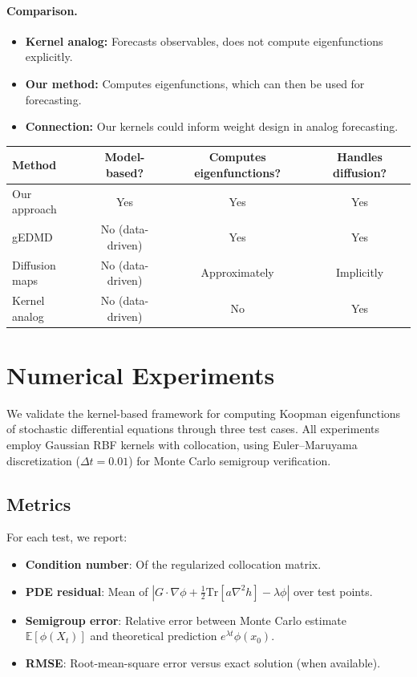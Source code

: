 \documentclass[11pt,a4paper]{article}
\newcommand{\E}{\mathbb{E}}
\newcommand{\Tr}{\mathrm{Tr}}
\begin{document}
\paragraph{Comparison.}
\begin{itemize}
\item \textbf{Kernel analog:} Forecasts observables, does not compute eigenfunctions explicitly.
\item \textbf{Our method:} Computes eigenfunctions, which can then be used for forecasting.
\item \textbf{Connection:} Our kernels could inform weight design in analog forecasting.
\end{itemize}

\begin{center}
\begin{tabular}{lccc}
\toprule
Method & Model-based? & Computes eigenfunctions? & Handles diffusion? \\
\midrule
Our approach & Yes & Yes & Yes \\
gEDMD & No (data-driven) & Yes & Yes \\
Diffusion maps & No (data-driven) & Approximately & Implicitly \\
Kernel analog & No (data-driven) & No & Yes \\
\bottomrule
\end{tabular}
\end{center}

\section{Numerical Experiments}\label{sec:numerical}

We validate the kernel-based framework for computing Koopman eigenfunctions of stochastic differential equations through three test cases. All experiments employ Gaussian RBF kernels with collocation, using Euler--Maruyama discretization ($\Delta t = 0.01$) for Monte Carlo semigroup verification.

\subsection{Metrics}

For each test, we report:
\begin{itemize}
    \item \textbf{Condition number}: Of the regularized collocation matrix.
    \item \textbf{PDE residual}: Mean of $|G\cdot\nabla\phi + \frac{1}{2}\Tr[a\nabla^2 h] - \lambda\phi|$ over test points.
    \item \textbf{Semigroup error}: Relative error between Monte Carlo estimate $\E[\phi(X_t)]$ and theoretical prediction $e^{\lambda t}\phi(x_0)$.
    \item \textbf{RMSE}: Root-mean-square error versus exact solution (when available).
\end{itemize}
\end{document}
